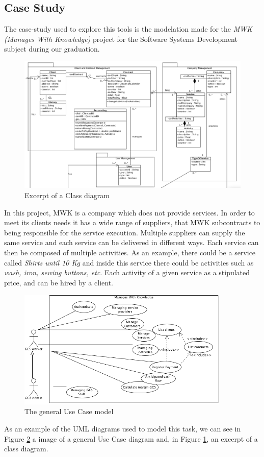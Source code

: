 \subsection*{Case Study}
The case-study used to explore this tools is the modelation made for the \textit{MWK (Manages With Knowledge)} project for the Software Systems Development subject during our graduation.

\begin{figure}[!htbp]
\begin{center}
\includegraphics[scale=0.345]{images/classbw.png}
\caption{Excerpt of a Class diagram}\label{fig:class}
\end{center}
\end{figure} 

\newpage
In this project, MWK is a company which does not provide services. 
In order to meet its clients needs it has a wide range of suppliers, that MWK subcontracts to being responsible for the service execution.
Multiple suppliers can supply the same service and each  service can be delivered in different ways.
Each service can then be composed of multiple activities. As an example, there could be a service called \textit{Shirts until 10 Kg} and inside this service there could be activities such as \textit{wash, iron, sewing buttons, etc}.
Each activity of a given service as a stipulated price, and can be hired by a client.

\begin{figure}[!htbp]
\begin{center}
\includegraphics[width=0.9\textwidth]{images/usecase.png}
\caption{The general Use Case model}\label{fig:usecase}
\end{center}
\end{figure} 

As an example of the UML diagrams used to model this task, we can see in Figure \ref{fig:usecase} a image of a general Use Case diagram and, in Figure \ref{fig:class}, an excerpt of a class diagram.
